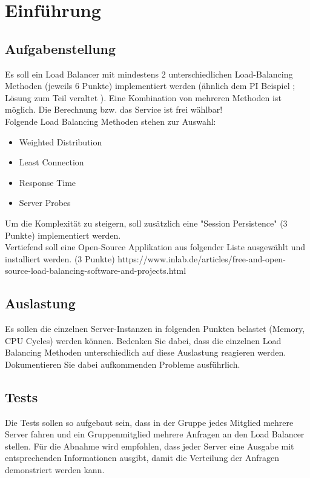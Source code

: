 \documentclass[letterpaper, 12pt]{article}
\let\tempsection\section
\renewcommand\section[1]{\vspace{-0.3cm}\tempsection{#1}\vspace{-0.3cm}}
\let\tempsubsection\subsection
\renewcommand\subsection[1]{\vspace{0cm}\tempsubsection{#1}\vspace{0cm}}
\begin{document}
\parindent 0pt
\parskip 6pt



\clearpage
\thispagestyle{empty}
\tableofcontents

\newpage
{}
\pagestyle{fancy}

\section{Einführung}
\subsection{Aufgabenstellung}
Es soll ein Load Balancer mit mindestens 2 unterschiedlichen Load-Balancing Methoden (jeweils 6 Punkte) implementiert werden (ähnlich dem PI Beispiel \cite{Angabe1}; Lösung zum Teil veraltet \cite{Angabe2}). Eine Kombination von mehreren Methoden ist möglich. Die Berechnung bzw. das Service ist frei wählbar! \\
Folgende Load Balancing Methoden stehen zur Auswahl:
\begin{itemize}
	\item Weighted Distribution
	\item Least Connection
	\item Response Time
	\item Server Probes
\end{itemize}
Um die Komplexität zu steigern, soll zusätzlich eine "Session Persistence" (3 Punkte) implementiert werden. \\
Vertiefend soll eine Open-Source Applikation aus folgender Liste ausgewählt und installiert werden. (3 Punkte)
https://www.inlab.de/articles/free-and-open-source-load-balancing-software-and-projects.html
\subsection{Auslastung}
Es sollen die einzelnen Server-Instanzen in folgenden Punkten belastet (Memory, CPU Cycles) werden können.
Bedenken Sie dabei, dass die einzelnen Load Balancing Methoden unterschiedlich auf diese Auslastung reagieren werden. Dokumentieren Sie dabei aufkommenden Probleme ausführlich.
\subsection{Tests}
Die Tests sollen so aufgebaut sein, dass in der Gruppe jedes Mitglied mehrere Server fahren und ein Gruppenmitglied mehrere Anfragen an den Load Balancer stellen. Für die Abnahme wird empfohlen, dass jeder Server eine Ausgabe mit entsprechenden Informationen ausgibt, damit die Verteilung der Anfragen demonstriert werden kann.
\end{document}
